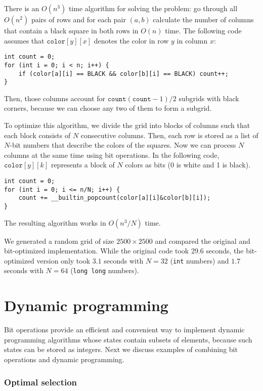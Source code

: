 There is an $O(n^3)$ time algorithm for solving the problem:
go through all $O(n^2)$ pairs of rows and for each pair
$(a,b)$ calculate the number of columns that contain a black
square in both rows in $O(n)$ time.
The following code assumes that $\texttt{color}[y][x]$
denotes the color in row $y$ in column $x$:
\begin{lstlisting}
int count = 0;
for (int i = 0; i < n; i++) {
    if (color[a][i] == BLACK && color[b][i] == BLACK) count++;
}
\end{lstlisting}
Then, those columns
account for $\texttt{count}(\texttt{count}-1)/2$ subgrids with black corners,
because we can choose any two of them to form a subgrid.

To optimize this algorithm, we divide the grid into blocks
of columns such that each block consists of $N$
consecutive columns. Then, each row is stored as
a list of $N$-bit numbers that describe the colors
of the squares. Now we can process $N$ columns at the same time
using bit operations. In the following code,
$\texttt{color}[y][k]$ represents
a block of $N$ colors as bits (0 is white and 1 is black).
\begin{lstlisting}
int count = 0;
for (int i = 0; i <= n/N; i++) {
    count += __builtin_popcount(color[a][i]&color[b][i]);
}
\end{lstlisting}
The resulting algorithm works in $O(n^3/N)$ time.

We generated a random grid of size $2500 \times 2500$
and compared the original and bit-optimized implementation.
While the original code took $29.6$ seconds,
the bit-optimized version only took $3.1$ seconds
with $N=32$ (\texttt{int} numbers) and $1.7$ seconds
with $N=64$ (\texttt{long long} numbers).

\section{Dynamic programming}

Bit operations provide an efficient and convenient
way to implement dynamic programming algorithms
whose states contain subsets of elements,
because such states can be stored as integers.
Next we discuss examples of combining
bit operations and dynamic programming.

\subsubsection{Optimal selection}

